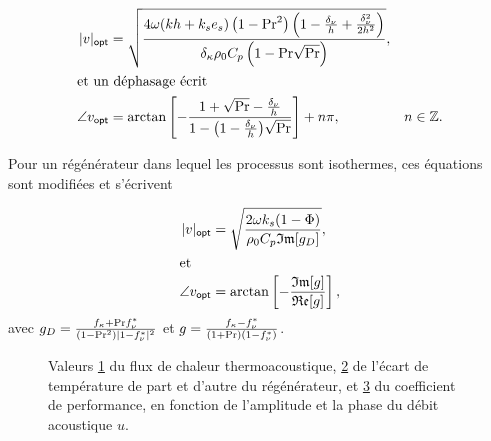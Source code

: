 \begin{subequations}
	\begin{align}
		|v|_{\sf opt} &= \sqrt{\frac{4 \omega (kh+k_se_s) \left(1-\mathrm{Pr}^2\right)\left(1-\frac{\delta_\nu}{h}+\frac{\delta_\nu^2}{2h^2}\right)}{\delta_\kappa \rho_0 C_p \left(1-\mathrm{Pr}\sqrt{\mathrm{Pr}}\right)}}, & 	\label{eq:u_mag_opt_Gaelle}\\
		\intertext{et un déphasage écrit}
		\angle v_{\sf opt} &= \arctan\left[-\frac{1+\sqrt{\mathrm{Pr}}-\frac{\delta_\nu}{h}}{1-\big(1-\frac{\delta_\nu}{h} \big)\sqrt{\mathrm{Pr}}}\right]+n \pi, & n \in \mathbb{Z}.	\label{eq:u_arg_opt_Gaelle}
	\end{align}
	\label{eq:u_opt_Gaelle}
\end{subequations}

Pour un régénérateur dans lequel les processus sont isothermes, ces équations sont modifiées et s'écrivent 

\begin{subequations}
	\begin{align}
		|v|_{\sf opt} &= \sqrt{\frac{2 \omega k_s(1-\Phi)}{\rho_0 C_p \mathfrak{Im}[g_D]}},\label{eq:u_mag_opt_reg_Gaelle} \\
		\intertext{et}
		\angle v_{\sf opt} &= \arctan\left[-\frac{\mathfrak{Im}[g]}{\mathfrak{Re}[g]}\right],
	\end{align}
\end{subequations}
avec $g_D = \frac{f_\kappa + \mathrm{Pr} f_\nu^*}{(1-\mathrm{Pr}^2)|1-f_\nu^*|^2}$ et $g = \frac{f_\kappa-f_\nu^*}{(1+\mathrm{Pr})(1-f_\nu^*)}$.

\begin{figure}[!ht]
    \centering
	\begin{subfigure}{.97\textwidth}
		\centering
		
		\caption{}
		\label{fig:DeltaEC_u_opt_Qth}
	\end{subfigure}
	\begin{subfigure}{.97\textwidth}
		\centering
		
		\caption{}
		\label{fig:DeltaEC_u_opt_DeltaT}
	\end{subfigure}
	
	\vspace{1em}	

	\begin{subfigure}{.97\textwidth}
		\centering
		
		\caption{}
		\label{fig:DeltaEC_u_opt_COP}
	\end{subfigure}  
    \caption{Valeurs \ref{fig:DeltaEC_u_opt_Qth} du flux de chaleur thermoacoustique, \ref{fig:DeltaEC_u_opt_DeltaT} de l'écart de température de part et d'autre du régénérateur, et \ref{fig:DeltaEC_u_opt_COP} du coefficient de performance, en fonction de l'amplitude et la phase du débit acoustique $u$. }
    \label{fig:DeltaEC_u_opt}
\end{figure}

